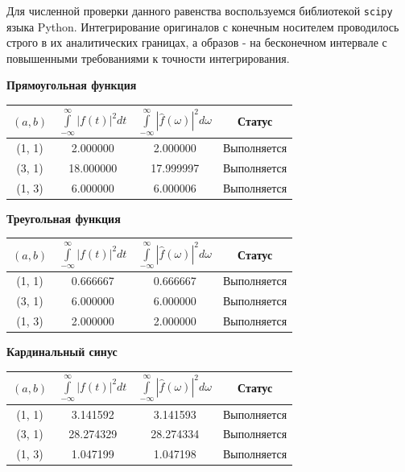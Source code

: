 \documentclass[a4paper,14pt]{extarticle}
\begin{document}
Для численной проверки данного равенства воспользуемся библиотекой \texttt{scipy} языка 
Python. Интегрирование оригиналов с конечным носителем проводилось строго в их 
аналитических границах, а образов - на бесконечном интервале с повышенными 
требованиями к точности интегрирования.

\textbf{Прямоугольная функция}\\
\begin{center}
\begin{tabular}{|c|c|c|c|}
    \hline
     $(a, b)$& $\int\limits_{-\infty}^{\infty} |f(t)|^2 dt$ & $\int\limits_{-\infty}^{\infty}|\hat{f}(\omega)|^2d\omega$ & Статус\\
     \hline
      (1, 1)& 2.000000 & 2.000000 & Выполняется \\
      \hline
      (3, 1)& 18.000000 & 17.999997 & Выполняется \\
      \hline
      (1, 3)& 6.000000 & 6.000006 & Выполняется\\
      \hline
\end{tabular}
\end{center}

\textbf{Треугольная функция}\\
\begin{center}
\begin{tabular}{|c|c|c|c|}
    \hline
     $(a, b)$& $\int\limits_{-\infty}^{\infty} |f(t)|^2 dt$ & $\int\limits_{-\infty}^{\infty}|\hat{f}(\omega)|^2d\omega$ & Статус\\
     \hline
      (1, 1)& 0.666667 & 0.666667 & Выполняется \\
      \hline
      (3, 1)& 6.000000 & 6.000000 & Выполняется \\
      \hline
      (1, 3)& 2.000000 & 2.000000 & Выполняется\\
      \hline
\end{tabular}
\end{center}

\textbf{Кардинальный синус}\\
\begin{center}
\begin{tabular}{|c|c|c|c|}
    \hline
     $(a, b)$& $\int\limits_{-\infty}^{\infty} |f(t)|^2 dt$ & $\int\limits_{-\infty}^{\infty}|\hat{f}(\omega)|^2d\omega$ & Статус\\
     \hline
      (1, 1)& 3.141592 & 3.141593 & Выполняется \\
      \hline
      (3, 1)& 28.274329 & 28.274334 & Выполняется \\
      \hline
      (1, 3)& 1.047199 & 1.047198 & Выполняется\\
      \hline
\end{tabular}
\end{center}
\end{document}
